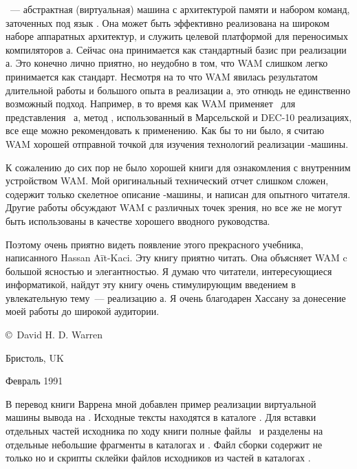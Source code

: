 \ --- абстрактная (виртуальная) машина с архитектурой памяти и набором
команд, заточенных под язык \prolog. Она может быть эффективно реализована на
широком наборе аппаратных архитектур, и служить целевой платформой для
переносимых компиляторов \prolog а. Сейчас она принимается как стандартный базис
при реализации \prolog а. Это конечно лично приятно, но неудобно в том, что WAM
слишком легко принимается как стандарт. Несмотря на то что WAM явилась
результатом длительной работы и большого опыта в реализации \prolog а, это
отнюдь не единственно возможный подход. Например, в то время как WAM применяет
\ для представления
\ \prolog а, метод , использованный в Марсельской и DEC-10 реализациях, все еще можно
рекомендовать к применению. Как бы то ни было, я считаю WAM хорошей отправной
точкой для изучения технологий реализации \prolog-машины.

К сожалению до сих пор не было хорошей книги для ознакомления с внутренним
устройством WAM. Мой оригинальный технический отчет слишком сложен, содержит
только скелетное описание \prolog-машины, и написан для опытного читателя.
Другие работы обсуждают WAM с различных точек зрения, но все же не могут быть
использованы в качестве хорошего вводного руководства.

Поэтому очень приятно видеть появление этого прекрасного учебника, написанного
Hassan A\"it-Kaci. Эту книгу приятно читать. Она объясняет WAM c большой
ясностью и элегантностью. Я думаю что читатели, интересующиеся информатикой,
найдут эту книгу очень стимулирующим введением в увлекательную тему\ ---
реализацию \prolog а. Я очень благодарен Хассану за донесение моей работы до
широкой аудитории.

\bigskip
\copyright\ David H. D. Warren

Бристоль, UK

Февраль 1991


В перевод книги Варрена мной добавлен пример
реализации виртуальной машины вывода на \cpp. Исходные тексты находятся в
каталоге
\href{https://github.com/ponyatov/boox/tree/master/prolog/warren}{}.
Для вставки отдельных частей исходника по ходу книги полные файлы
\ и  разделены на отдельные небольшие фрагменты в
каталогах  и . Файл сборки 
содержит не только  
но и скрипты склейки файлов исходников из частей в каталогах 
\dir{cpp/} \dir{mk/}.

